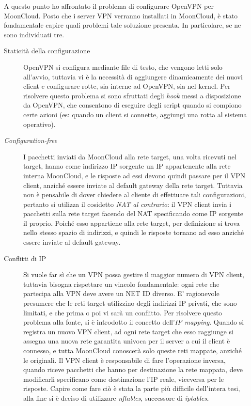 \documentclass[10pt,a4paper]{article}
\begin{document}
        A questo punto ho affrontato il problema di configurare OpenVPN per
        MoonCloud. Posto che i server VPN verranno installati in MoonCloud, è stato
        fondamentale capire quali problemi tale soluzione
        presenta. In particolare, se ne sono individuati tre.
        \begin{description}
            \item[Staticità della configurazione]OpenVPN si configura mediante
            file di testo, che vengono letti solo all'avvio, tuttavia vi è la necessità
            di aggiungere dinamicamente dei nuovi client e configurare
            rotte, sia interne ad OpenVPN, sia nel kernel.
            Per risolvere questo problema
            si sono sfruttati degli \textit{hook} messi a disposizione da OpenVPN, che
            consentono di eseguire degli script quando si compiono certe azioni
            (es: quando un client si connette, aggiungi una rotta al sistema operativo).
            \item[\textit{Configuration-free}]I pacchetti inviati da MoonCloud alla rete
            target, una volta ricevuti nel target, hanno come indirizzo IP sorgente un IP appartenente
            alla rete interna MoonCloud, e le risposte ad essi devono quindi passare
            per il VPN client, anziché essere inviate al default gateway della rete target.
            Tuttavia non è pensabile di dover chiedere al cliente di effettuare tali configurazioni,
            pertanto si utilizza il cosidetto \textit{NAT al contrario}: il VPN
            client invia i pacchetti sulla rete target facendo del NAT specificando come IP sorgente
            il proprio. Poiché esso appartiene alla rete target, per definizione si trova
            nello stesso spazio di indirizzi, e quindi le risposte tornano ad esso anziché essere
            inviate al default gateway.
            \item[Conflitti di IP]Si vuole far sì che un VPN possa gestire il maggior numero
            di VPN client, tuttavia bisogna rispettare un vincolo fondamentale: ogni rete che
            partecipa alla VPN deve avere un NET ID diverso. E' ragionevole presumere che
            le reti target utilizzino degli indirizzi IP privati, che sono limitati, e che prima
            o poi vi sarà un conflitto. Per risolvere questo problema alla fonte, si è introdotto
            il concetto dell'\textit{IP mapping}. Quando si registra un nuovo VPN client, ad ogni
            rete target che esso raggiunge si assegna una nuova rete garantita univoca per
            il server a cui il client è connesso, e tutta MoonCloud conoscerà solo queste
            reti mappate, anziché le originali.
            Il VPN client è responsabile di fare l'operazione inversa, quando riceve pacchetti
            che hanno per destinazione la rete mappata, deve modificarli specificano come
            destinazione l'IP reale, viceversa per le risposte.
            Capire come fare ciò è stata la parte più difficile dell'intera tesi, alla fine
            si è deciso di utilizzare \textit{nftables}, successore di \textit{iptables}.
        \end{description}
\end{document}
